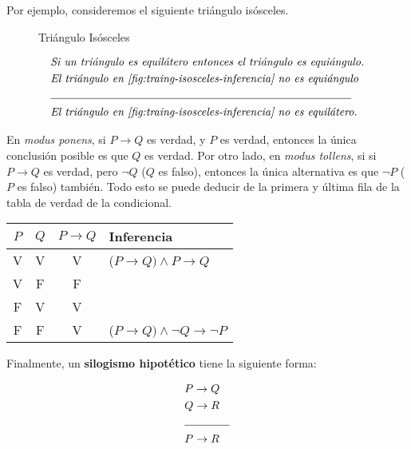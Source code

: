 Por ejemplo, consideremos el siguiente triángulo isósceles. 

\begin{figure}[!h]
    \centering
    
    \caption{Triángulo Isósceles}            
    \label{fig:traing-isosceles-inferencia}
\end{figure}

\begin{equation*}
    \begin{split}
        & \textit{Si un triángulo es equilátero entonces el triángulo es equiángulo.} \\
        & \textit{El triángulo en \cref{fig:traing-isosceles-inferencia} no es equiángulo} \\
        & \text{\noindent\rule{27em}{0.4pt}} \\
        & \textit{El triángulo en \cref{fig:traing-isosceles-inferencia} no es equilátero.}
    \end{split}
\end{equation*}

En \textit{\color{blue} modus ponens}, si $P \rightarrow Q$ es verdad, y $P$ es verdad, entonces la única conclusión posible es que $Q$ es verdad. Por otro lado, en \textit{\color{red} modus tollens}, si si $P \rightarrow Q$ es verdad, pero $\neg Q$ ($Q$ es falso), entonces la única alternativa es que $\neg P$ ($P$ es falso) también. Todo esto se puede deducir de la primera y última fila de  la tabla de verdad de la condicional.

\begin{center}
    \begin{tabular}{c|c|c|l}
        $P$ & $Q$ & $P \rightarrow Q$ & Inferencia \\
        \hline
        {\color{blue}V} & {\color{blue}V} & {\color{blue}V} & {\color{blue} ($P \rightarrow Q) \wedge P \rightarrow Q$ }\\
        V & F & F \\
        F & V & V \\
        {\color{red} F} & {\color{red} F} & {\color{red} V} & {\color{red} ($P \rightarrow Q) \wedge \neg Q \rightarrow \neg P$}
    \end{tabular}
    \label{tab:condicional-tabla-inferencia}
\end{center}

Finalmente, un \textbf{silogismo hipotético} tiene la siguiente forma:

\begin{equation*}
    \begin{split}
        & P \rightarrow Q \\
        & Q \rightarrow R\\
        & \text{\noindent\rule{4em}{0.4pt}} \\
        & P \rightarrow R
    \end{split}
\end{equation*}


